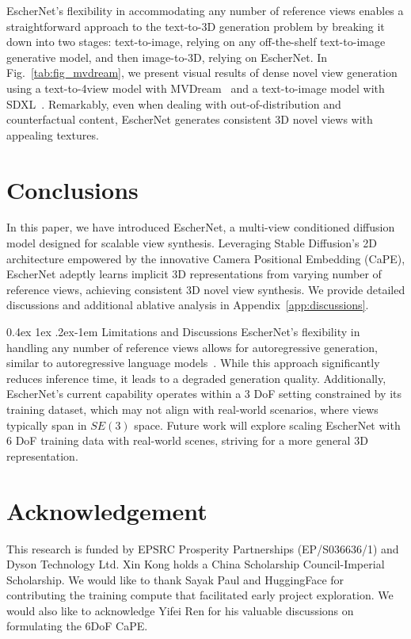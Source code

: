 \documentclass[10pt,twocolumn,letterpaper]{article}
\makeatletter
\renewcommand{\paragraph}{%
  \@startsection{paragraph}{4}%
  {\z@}{0.4ex \@plus 1ex \@minus .2ex}{-1em}%
  {\normalfont\normalsize\bfseries}%
}
\makeatother
\begin{document}
EscherNet's flexibility in accommodating any number of reference views enables a straightforward approach to the text-to-3D generation problem by breaking it down into two stages: text-to-image, relying on any off-the-shelf text-to-image generative model, and then image-to-3D, relying on EscherNet. In Fig.~\ref{tab:fig_mvdream}, we present visual results of dense novel view generation using a text-to-4view model with MVDream~\cite{shi2023mvdream} and a text-to-image model with SDXL~\cite{podell2023sdxl}. Remarkably, even when dealing with out-of-distribution and counterfactual content, EscherNet generates consistent 3D novel views with appealing textures.


\section{Conclusions}
In this paper, we have introduced EscherNet, a multi-view conditioned diffusion model designed for scalable view synthesis. Leveraging Stable Diffusion's 2D architecture empowered by the innovative Camera Positional Embedding (CaPE), EscherNet adeptly learns implicit 3D representations from varying number of reference views, achieving consistent 3D novel view synthesis. We provide detailed discussions and additional ablative analysis in Appendix~\ref{app:discussions}.

\paragraph{Limitations and Discussions} 
EscherNet's flexibility in handling any number of reference views allows for autoregressive generation, similar to autoregressive language models~\cite{brown2020gpt3, chowdhery2022palm}. While this approach significantly reduces inference time, it leads to a degraded generation quality. Additionally, EscherNet's current capability operates within a 3 DoF setting constrained by its training dataset, which may not align with real-world scenarios, where views typically span in $SE(3)$ space. Future work will explore scaling EscherNet with 6 DoF training data with real-world scenes, striving for a more general 3D representation. 


\section*{Acknowledgement}
This research is funded by EPSRC Prosperity Partnerships (EP/S036636/1) and Dyson Technology Ltd.
Xin Kong holds a China Scholarship Council-Imperial Scholarship. We would like to thank Sayak Paul and HuggingFace for contributing the training compute that facilitated early project exploration. We would also like to acknowledge Yifei Ren for his valuable discussions on formulating the 6DoF CaPE.
\end{document}
